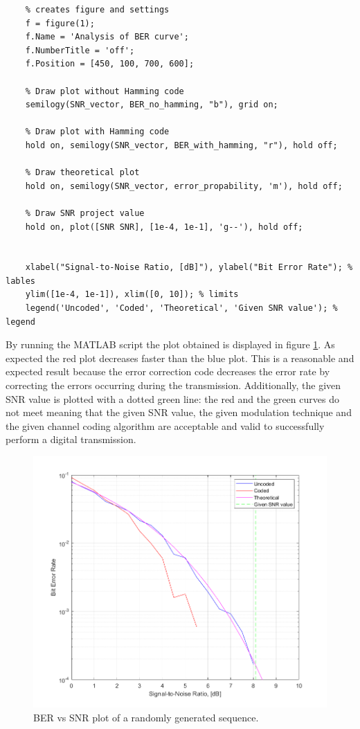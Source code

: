 \begin{lstlisting}
    % creates figure and settings
    f = figure(1);
    f.Name = 'Analysis of BER curve';
    f.NumberTitle = 'off';
    f.Position = [450, 100, 700, 600];
    
    % Draw plot without Hamming code
    semilogy(SNR_vector, BER_no_hamming, "b"), grid on;

    % Draw plot with Hamming code
    hold on, semilogy(SNR_vector, BER_with_hamming, "r"), hold off;

    % Draw theoretical plot
    hold on, semilogy(SNR_vector, error_propability, 'm'), hold off;

    % Draw SNR project value
    hold on, plot([SNR SNR], [1e-4, 1e-1], 'g--'), hold off;

    
    xlabel("Signal-to-Noise Ratio, [dB]"), ylabel("Bit Error Rate"); % lables
    ylim([1e-4, 1e-1]), xlim([0, 10]); % limits
    legend('Uncoded', 'Coded', 'Theoretical', 'Given SNR value'); % legend
\end{lstlisting}

\noindent By running the MATLAB script the plot obtained is displayed in figure \ref{fig:BER-plot}. As expected the red plot decreases faster than the blue plot. This is a reasonable and expected result because the error correction code decreases the error rate by correcting the errors occurring during the transmission. Additionally, the given SNR value is plotted with a dotted green line: the red and the green curves do not meet meaning that the given SNR value, the given modulation technique and the given channel coding algorithm are acceptable and valid to successfully perform a digital transmission. 

\begin{figure}[h]
    \centering
    \includegraphics[width = \textwidth]{../res/imgs/BER-plot.png}
    \caption{BER vs SNR plot of a randomly generated sequence.}
    \label{fig:BER-plot}
\end{figure}

